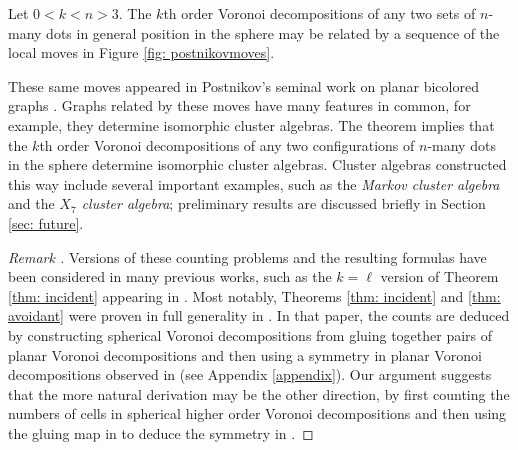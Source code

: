 \documentclass[11pt,oneside]{amsart}
\newenvironment{rethm}[1]
  {\renewcommand\theinnercustomthm{#1}\innercustomthm}
  {\endinnercustomthm}
\theoremstyle{definition}
\theoremstyle{remark}
\newenvironment{rem}{\refstepcounter{thm}\begin{proof}[Remark \emph{\thethm}]\renewcommand*{\qedsymbol}{\(\blacksquare\)}}{\end{proof}}
\numberwithin{equation}{section}
\begin{document}



\begin{rethm}{C}\label{thm: move equiv}
Let $0<k<n>3$. The $k$th order Voronoi decompositions of any two sets of $n$-many dots in general position in the sphere may be related by a sequence of the local moves in Figure \ref{fig: postnikovmoves}.
\end{rethm}



These same moves appeared in Postnikov's seminal work on planar bicolored graphs \cite{Pos}. %
Graphs related by these moves have many features in common, for example, they determine isomorphic cluster algebras. %
%
The theorem implies that the $k$th order Voronoi decompositions of any two configurations of $n$-many dots in the sphere determine isomorphic cluster algebras. Cluster algebras constructed this way include several important examples, such as the \emph{Markov cluster algebra} and the \emph{$X_7$ cluster algebra}; preliminary results are discussed briefly in Section \ref{sec: future}.%

\begin{rem}
Versions of these counting problems and the resulting formulas have been considered in many previous works, such as the $k=\ell$ version of Theorem \ref{thm: incident} appearing in \cite{Ard04}. Most notably, Theorems \ref{thm: incident} and \ref{thm: avoidant} were proven in full generality in \cite{CHP22}. In that paper, the counts are deduced by constructing spherical Voronoi decompositions from gluing together pairs of planar Voronoi decompositions and then using a symmetry in planar Voronoi decompositions observed in \cite{Lin03} (see Appendix \ref{appendix}).
Our argument suggests that the more natural derivation may be the other direction, by first counting the numbers of cells in spherical higher order Voronoi decompositions and then using the gluing map in \cite{CHP22} to deduce the symmetry in \cite{Lin03}.
\end{rem}
\end{document}
